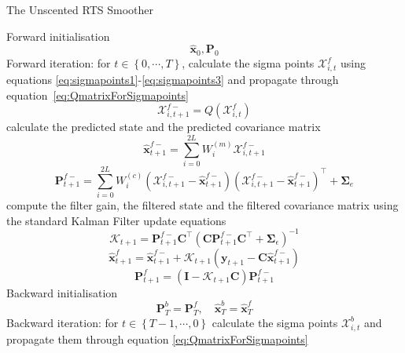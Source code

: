 \documentclass[twocolumn,11pt,a4paper]{article}		%
\begin{document}
\begin{algorithm}
	\begin{small}
	\caption{The Unscented RTS Smoother}\label{UKFAlgorithm} 
	\begin{algorithmic}[1] 
		\State Forward initialisation 
		\begin{equation*}
		 \hat{\mathbf x}_0, \mathbf P_0 
		\end{equation*}
		\State Forward iteration: for $t \in \left\lbrace 0,\cdots, T\right\rbrace $,
		calculate the sigma points $\mathcal X_{i,t}^f$ using equations \ref{eq:sigmapoints1}-\ref{eq:sigmapoints3} and propagate through equation~\ref{eq:QmatrixForSigmapoints}
		\begin{equation*}
			\mathcal X_{i,t+1}^{f-}=Q(\mathcal X_{i,t}^f) 
		\end{equation*}
		calculate the predicted state and the predicted covariance matrix
		\begin{equation*}
			\hat{\mathbf x}_{t+1}^{f-}=\sum_{i=0}^{2L} W_i^{(m)}\mathcal X_{i,t+1}^{f-} 
		\end{equation*}
		\begin{equation*}
			\mathbf P_{t +1}^{f-}=\sum_{i=0}^{2L} W_i^{(c)}(\mathcal X_{i,t+1}^{f-}-\hat{\mathbf x}_{t +1}^{f-})(\mathcal X_{i,t+1}^{f-}-\hat{\mathbf x}_{t +1}^{f-})^\top+\boldsymbol \Sigma_e 
		\end{equation*}
		compute the filter gain, the filtered state and the filtered covariance matrix using the standard Kalman Filter update equations
		\begin{equation*}
			\mathcal K_{t+1}=\mathbf P_{t +1}^{f-}\mathbf C ^\top(\mathbf C \mathbf P_{t +1}^{f-}\mathbf C ^\top+\boldsymbol \Sigma_{\epsilon})^{-1} 
		\end{equation*}
		\begin{equation*}
			\hat{\mathbf x}_{t+1}^{f}=\hat{\mathbf x}_{t+1}^{f-}+\mathcal K_{t+1}(\mathbf y_{t+1}-\mathbf C\hat{\mathbf x}_{t +1}^{f-}) 
		\end{equation*}
		\begin{equation*}
			\mathbf P_{t+1}^f=(\mathbf I - \mathcal K_{t+1}\mathbf C)\mathbf P_{t +1}^{f-} 
		\end{equation*}
		\State Backward initialisation 
		\begin{equation*}
			\mathbf P_T^b= \mathbf P_T^f, \quad \hat{\mathbf x}^b_T= \hat{\mathbf x}^f_T 
		\end{equation*}
		\State Backward iteration: for $t \in \left\lbrace T-1, \cdots, 0 \right\rbrace $ calculate the sigma points $\mathcal X_{i,t}^b$ and propagate them through equation \ref{eq:QmatrixForSigmapoints}

\end{algorithmic}
\end{small}
\end{algorithm}
\end{document}
